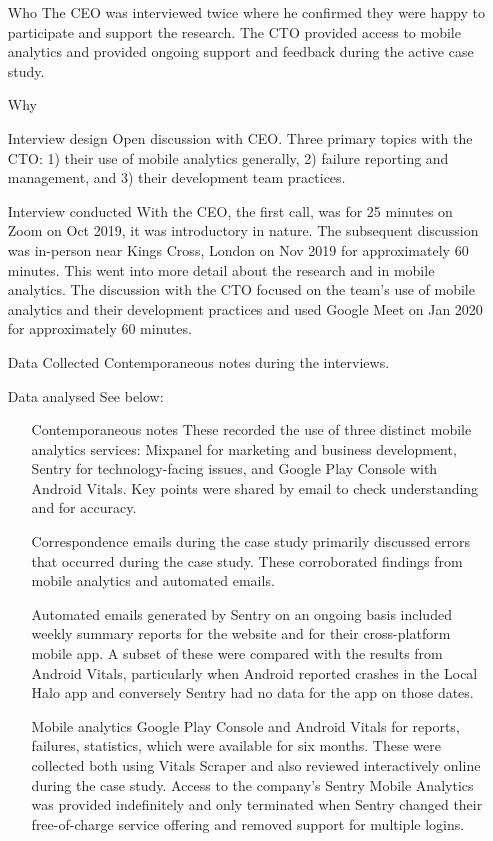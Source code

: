 \begin{itemize}
    \item[Who] The CEO was interviewed twice where he confirmed they were happy to participate and support the research. The CTO provided access to mobile analytics and provided ongoing support and feedback during the active case study. 
    \item[Why]
    \item[Interview design] Open discussion with CEO. Three primary topics with the CTO: 1) their use of mobile analytics generally, 2) failure reporting and management, and 3) their development team practices.
    \item[Interview conducted] With the CEO, the first call, was for 25 minutes on Zoom on  Oct 2019, it was introductory in nature. The subsequent discussion was in-person near Kings Cross, London  on  Nov 2019 for approximately 60 minutes. This went into more detail about the research and in mobile analytics. The discussion with the CTO focused on the team's use of mobile analytics and their development practices and used Google Meet on  Jan 2020 for approximately 60 minutes.
    \item[Data Collected] Contemporaneous notes during the interviews. 
    \item[Data analysed] See below:
    \begin{itemize}
        \item[Contemporaneous notes] These recorded the use of three distinct mobile analytics services: Mixpanel for marketing and business development, Sentry for technology-facing issues, and Google Play Console with Android Vitals. Key points were shared by email to check understanding and for accuracy.
        \item[Correspondence emails] during the case study primarily discussed errors that occurred during the case study. These corroborated findings from mobile analytics and automated emails.
        \item[Automated emails] generated by Sentry on an ongoing basis included weekly summary reports for the website and for their cross-platform mobile app. A subset of these were compared with the results from Android Vitals, particularly when Android reported crashes in the Local Halo app and conversely Sentry had no data for the app on those dates.
        \item[Mobile analytics] Google Play Console and Android Vitals for reports, failures, statistics, which were available for six months. These were collected both using Vitals Scraper and also reviewed interactively online during the case study. Access to the company's Sentry Mobile Analytics was provided indefinitely and only terminated when Sentry changed their free-of-charge service offering and removed support for multiple logins. 

\end{itemize}
\end{itemize}
